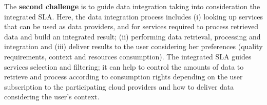 \documentclass[11pt,a4paper,oneside]{report}
\begin{document}
%

The \textbf{second challenge} is to guide data integration taking into consideration the integrated SLA. Here, the data integration process includes (i) looking up services that can be used as data providers, and for services required to process retrieved data and build an integrated result; (ii) performing data retrieval, processing and integration and (iii) deliver results to the user considering her preferences (quality requirements, context and resources consumption). The integrated SLA guides services selection and filtering; it can help to control the amounts of data to retrieve and process according to consumption rights depending on the user subscription to the participating cloud providers and how to deliver data considering the user's context.

\end{document}
